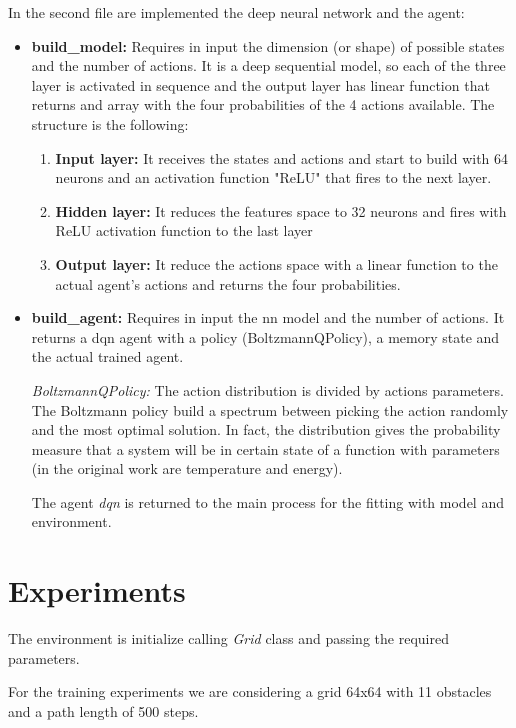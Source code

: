 In the second file are implemented the deep neural network and the agent:
\begin{itemize}
    \item \textbf{build\_model: }Requires in input the dimension (or shape) of possible states and the number of actions. It is a deep sequential model, so each of the three layer is activated in sequence and the output layer has linear function that returns and array with the four probabilities of the 4 actions available.
    The structure is the following:
    \begin{enumerate}
        \item \textbf{Input layer: }It receives the states and actions and start to build with 64 neurons and an activation function "ReLU" that fires to the next layer.
        \item \textbf{Hidden layer: }It reduces the features space to 32 neurons and fires with ReLU activation function to the last layer
        \item \textbf{Output layer: }It reduce the actions space with a linear function to the actual agent's actions and returns the four probabilities.
    \end{enumerate}
    \item \textbf{build\_agent: }Requires in input the nn model and the number of actions. It returns a dqn agent with a policy (BoltzmannQPolicy), a memory state and the actual trained agent.
    
    \textit{BoltzmannQPolicy: }The action distribution is divided by actions parameters. The Boltzmann policy build a spectrum between picking the action randomly and the most optimal solution. In fact, the distribution gives the probability measure that a system will be in certain state of a function with parameters (in the original work are temperature and energy). 
    
    The agent \textit{dqn} is returned to the main process for the fitting with model and environment. 
\end{itemize}

\section{Experiments}

The environment is initialize calling \textit{Grid} class and passing the required parameters. 

For the training experiments we are considering a grid 64x64 with 11 obstacles and a path length of 500 steps. 

